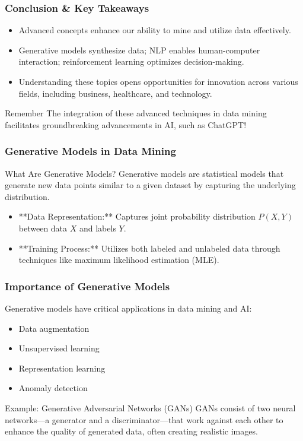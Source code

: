 \documentclass[aspectratio=169]{beamer}
\begin{document}
\begin{frame}[fragile]
    \frametitle{Conclusion \& Key Takeaways}
    \begin{itemize}
        \item Advanced concepts enhance our ability to mine and utilize data effectively.
        \item Generative models synthesize data; NLP enables human-computer interaction; reinforcement learning optimizes decision-making.
        \item Understanding these topics opens opportunities for innovation across various fields, including business, healthcare, and technology.
    \end{itemize}
    \begin{block}{Remember}
        The integration of these advanced techniques in data mining facilitates groundbreaking advancements in AI, such as ChatGPT!
    \end{block}
\end{frame}

\begin{frame}[fragile]
    \frametitle{Generative Models in Data Mining}
    \begin{block}{What Are Generative Models?}
        Generative models are statistical models that generate new data points similar to a given dataset by capturing the underlying distribution.
    \end{block}
    \begin{itemize}
        \item **Data Representation:** Captures joint probability distribution \( P(X, Y) \) between data \( X \) and labels \( Y \).
        \item **Training Process:** Utilizes both labeled and unlabeled data through techniques like maximum likelihood estimation (MLE).
    \end{itemize}
\end{frame}

\begin{frame}[fragile]
    \frametitle{Importance of Generative Models}
    Generative models have critical applications in data mining and AI:
    \begin{itemize}
        \item Data augmentation
        \item Unsupervised learning
        \item Representation learning
        \item Anomaly detection
    \end{itemize}

    \begin{block}{Example: Generative Adversarial Networks (GANs)}
        GANs consist of two neural networks—a generator and a discriminator—that work against each other to enhance the quality of generated data, often creating realistic images.
    \end{block}
\end{frame}
\end{document}
